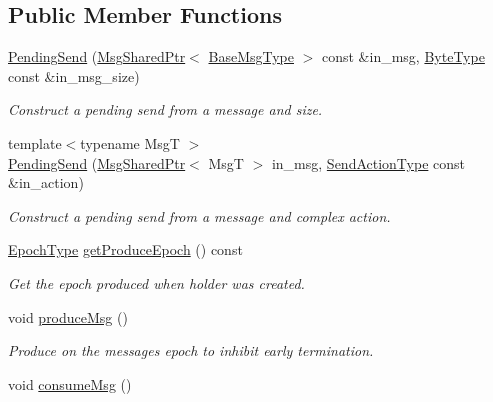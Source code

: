 \subsection*{Public Member Functions}
\begin{DoxyCompactItemize}
\item 
\hyperlink{structvt_1_1messaging_1_1_pending_send_a026f0aed2099e7e1017aee5bd62ea9cd}{Pending\+Send} (\hyperlink{structvt_1_1messaging_1_1_msg_shared_ptr}{Msg\+Shared\+Ptr}$<$ \hyperlink{namespacevt_a44d0d4e144748f2b19a1cfd962f50338}{Base\+Msg\+Type} $>$ const \&in\+\_\+msg, \hyperlink{namespacevt_aab8d55968084610ce3b17057981e9300}{Byte\+Type} const \&in\+\_\+msg\+\_\+size)
\begin{DoxyCompactList}\small\item\em Construct a pending send from a message and size. \end{DoxyCompactList}\item 
{\footnotesize template$<$typename MsgT $>$ }\\\hyperlink{structvt_1_1messaging_1_1_pending_send_a002fd7c23b5b53c49576fc0d7ba078fa}{Pending\+Send} (\hyperlink{structvt_1_1messaging_1_1_msg_shared_ptr}{Msg\+Shared\+Ptr}$<$ MsgT $>$ in\+\_\+msg, \hyperlink{structvt_1_1messaging_1_1_pending_send_a758cf5a064cb5198b47e979c891fecd6}{Send\+Action\+Type} const \&in\+\_\+action)
\begin{DoxyCompactList}\small\item\em Construct a pending send from a message and complex action. \end{DoxyCompactList}\item 
\hyperlink{namespacevt_a985a5adf291c34a3ca263b3378388236}{Epoch\+Type} \hyperlink{structvt_1_1messaging_1_1_pending_send_a6e6d77bd24d90496826371b900d1979b}{get\+Produce\+Epoch} () const
\begin{DoxyCompactList}\small\item\em Get the epoch produced when holder was created. \end{DoxyCompactList}\item 
void \hyperlink{structvt_1_1messaging_1_1_pending_send_af5961bb21b4a427732be91ac699d570b}{produce\+Msg} ()
\begin{DoxyCompactList}\small\item\em Produce on the messages epoch to inhibit early termination. \end{DoxyCompactList}\item 
void \hyperlink{structvt_1_1messaging_1_1_pending_send_a0f249a127a798ba0823fae82c925ed3b}{consume\+Msg} ()

\end{DoxyCompactItemize}
